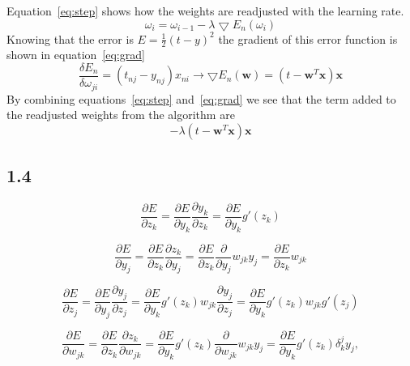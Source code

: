 \documentclass{article}
\begin{document}
Equation~\eqref{eq:step} shows how the weights are readjusted with the learning rate. 
\begin{equation}
\omega_i = \omega_{i-1} - \lambda\bigtriangledown E_n(\omega_i)
\label{eq:step}
\end{equation}
Knowing that the error is $E=\frac{1}{2}(t-y)^2$ the gradient of this error function is shown in equation~\eqref{eq:grad}
\begin{equation}
	\frac{\delta E_n}{\delta \omega_{ji}} = (t_{nj} - y_{nj})x_{ni} \rightarrow \bigtriangledown E_n(\textbf{w}) = (t - \textbf{w}^T\textbf{x})\textbf{x}
	\label{eq:grad}
\end{equation}
By combining equations~\eqref{eq:step} and~\eqref{eq:grad} we see that the term added to the readjusted weights from the algorithm are
\begin{equation*}
	-\lambda(t - \textbf{w}^T\textbf{x})\textbf{x}
	\label{eq:addterm}
\end{equation*}

\subsection*{1.4}

\begin{equation}
\frac{\partial E}{\partial z_k} = \frac{\partial E}{\partial y_k} \frac{\partial y_k}{\partial z_k} = \frac{\partial E}{\partial y_k} g'(z_k)
\end{equation}

\begin{equation}
\frac{\partial E}{\partial y_j} = \frac{\partial E}{\partial z_k} \frac{\partial z_k}{\partial y_j} =
\frac{\partial E}{\partial z_k} \frac{\partial}{\partial y_j} w_{jk} y_j =\frac{\partial E}{\partial z_k} w_{jk}
\end{equation}

\begin{equation}
\frac{\partial E}{\partial z_j} = \frac{\partial E}{\partial y_j} \frac{\partial y_j}{\partial z_j} = \frac{\partial E}{\partial y_k} g'(z_k) w_{jk} \frac{\partial y_j}{\partial z_j} = \frac{\partial E}{\partial y_k} g'(z_k) w_{jk} g'(z_j)
\end{equation}

\begin{equation}
\frac{\partial E}{\partial w_{jk}} = \frac{\partial E}{\partial z_k} \frac{\partial z_k}{\partial w_{jk}} = \frac{\partial E}{\partial y_k} g'(z_k) \frac{\partial}{\partial w_{jk}} w_{jk}y_{j} = \frac{\partial E}{\partial y_k} g'(z_k) \delta^j_k y_j,
\end{equation}
\end{document}
